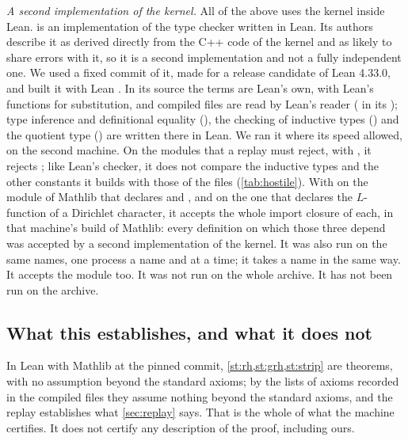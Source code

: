 \emph{A second implementation of the kernel.} All of the above uses the kernel inside Lean.
 \cite{lean4lean} is an implementation of the type checker written in Lean.
Its authors describe it as derived directly from the C++ code of the kernel and as likely to
share errors with it, so it is a second implementation and not a fully independent one. We
used a fixed commit of it, made for a release candidate of Lean 4.33.0, and built it with
Lean \leanversion{}. In its source the terms are Lean's own, with Lean's functions for
substitution, and compiled files are read by Lean's reader ( in
its ); type inference and definitional equality
(), the checking of inductive types () and
the quotient type () are written there in Lean. We ran it where its speed
allowed, on the second machine. On the \hostilebad{} modules that a replay must reject, with
, it
rejects \independentfreshrejects{}; like Lean's checker, it does not compare the inductive
types and the other constants it builds with those of the files (\cref{tab:hostile}). With
 on the module of Mathlib that declares  and
, and on the one that declares the $L$-function of a Dirichlet character,
it accepts the whole import closure of each, in that machine's build of Mathlib: every
definition on which those three depend was accepted by a second implementation of the
kernel.
\ifsecondrun
It was also run on the same \independentsample{} names, one process a name and
\independentsampleatatime{} at a time; it takes a name in the same way.
\independentsamplenote{} It accepts the module  too. It was not run on the
whole archive.
\else
It has not been run on the archive.
\fi

\subsection{What this establishes, and what it does not}
In Lean \leanversion{} with Mathlib at the pinned commit, \cref{st:rh,st:grh,st:strip} are
theorems\ifsecondrun, with no assumption beyond the standard axioms\else; by the lists of
axioms recorded in the compiled files they assume nothing beyond the standard axioms, and
the replay establishes what \cref{sec:replay} says\fi. That is the whole of what the machine
certifies. It does not certify any description of the proof, including ours.

